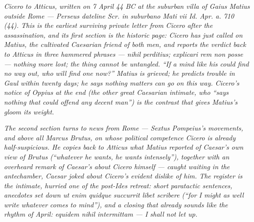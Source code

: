 
\textit{Cicero to Atticus, written on 7 April 44 BC at the suburban
villa of Gaius Matius outside Rome --- Perseus dateline
\textit{Scr. in suburbano Mati vii Id. Apr. a. 710 (44)}. This is
the earliest surviving private letter from Cicero after the
assassination, and its first section is the historic page: Cicero
has just called on Matius, the cultivated Caesarian friend of
both men, and reports the verdict back to Atticus in three
hammered phrases --- \textit{nihil perditius; explicari rem non
posse} --- nothing more lost; the thing cannot be untangled. ``If
a mind like his could find no way out, who will find one now?''
Matius is grieved; he predicts trouble in Gaul within twenty
days; he says nothing matters can go on this way. Cicero's
notice of Oppius at the end (the other great Caesarian
intimate, who ``says nothing that could offend any decent
man'') is the contrast that gives Matius's gloom its weight.}

\textit{The second section turns to news from Rome --- Sextus
Pompeius's movements, and above all Marcus Brutus, on whose
political competence Cicero is already half-suspicious. He
copies back to Atticus what Matius reported of Caesar's own
view of Brutus (``whatever he wants, he wants intensely''),
together with an overheard remark of Caesar's about Cicero
himself --- caught waiting in the antechamber, Caesar joked
about Cicero's evident dislike of him. The register is the
intimate, hurried one of the post-Ides retreat: short paratactic
sentences, anecdotes set down \textit{ut enim quidque succurrit
libet scribere} (``for I might as well write whatever comes to
mind''), and a closing that already sounds like the rhythm of
April: \textit{equidem nihil intermittam} --- I shall not let
up.}
